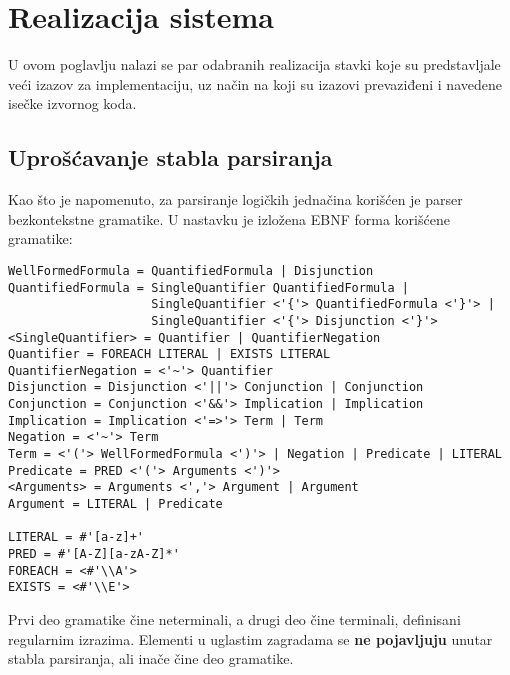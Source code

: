 \chapter{Realizacija sistema}\label{realizacija}
U ovom poglavlju nalazi se par odabranih realizacija stavki koje su predstavljale veći izazov za implementaciju, uz način na koji su izazovi prevaziđeni i navedene isečke izvornog koda.

\section{Uprošćavanje stabla parsiranja}
\label{sec:syntax}
Kao što je napomenuto, za parsiranje logičkih jednačina korišćen je parser bezkontekstne gramatike. U nastavku je izložena EBNF forma korišćene gramatike:
\begin{verbatim}
WellFormedFormula = QuantifiedFormula | Disjunction
QuantifiedFormula = SingleQuantifier QuantifiedFormula |
                    SingleQuantifier <'{'> QuantifiedFormula <'}'> |
                    SingleQuantifier <'{'> Disjunction <'}'>
<SingleQuantifier> = Quantifier | QuantifierNegation
Quantifier = FOREACH LITERAL | EXISTS LITERAL
QuantifierNegation = <'~'> Quantifier
Disjunction = Disjunction <'||'> Conjunction | Conjunction
Conjunction = Conjunction <'&&'> Implication | Implication
Implication = Implication <'=>'> Term | Term
Negation = <'~'> Term
Term = <'('> WellFormedFormula <')'> | Negation | Predicate | LITERAL
Predicate = PRED <'('> Arguments <')'>
<Arguments> = Arguments <','> Argument | Argument
Argument = LITERAL | Predicate

LITERAL = #'[a-z]+'
PRED = #'[A-Z][a-zA-Z]*'
FOREACH = <#'\\A'>
EXISTS = <#'\\E'>
\end{verbatim}
Prvi deo gramatike čine neterminali, a drugi deo čine terminali, definisani regularnim izrazima. Elementi u uglastim zagradama se \textbf{ne pojavljuju} unutar stabla parsiranja, ali inače čine deo gramatike.

